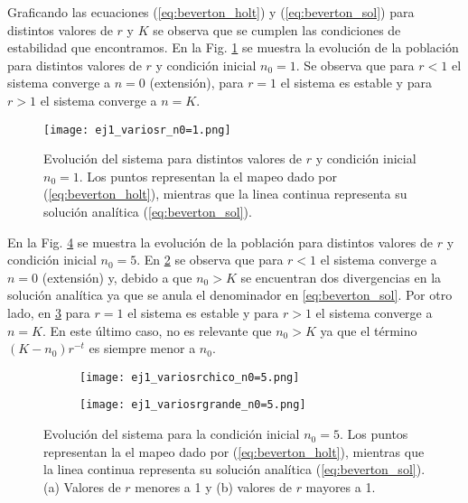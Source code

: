 \documentclass[letterpaper,12pt]{article}
\theoremstyle{plain}
\begin{document}
Graficando las ecuaciones (\ref*{eq:beverton_holt}) y (\ref*{eq:beverton_sol}) para distintos valores de $r$ y $K$ se observa que se cumplen las condiciones de estabilidad que encontramos. En la Fig. \ref*{fig:ej1_variosr_n0=1} se muestra la evolución de la población para distintos valores de $r$ y condición inicial $n_0=1$. Se observa que para $r<1$ el sistema converge a $n=0$ (extensión), para $r=1$ el sistema es estable y para $r>1$ el sistema converge a $n=K$.

\begin{figure}[h]
    \centering
    \texttt{[image: ej1\_variosr\_n0=1.png]}
    \caption{Evolución del sistema para distintos valores de $r$ y condición inicial $n_0=1$. Los puntos representan la el mapeo dado por (\ref*{eq:beverton_holt}), mientras que la linea continua representa su solución analítica (\ref*{eq:beverton_sol}).} 
    \label{fig:ej1_variosr_n0=1}
\end{figure}

En la Fig. \ref*{fig:ej1_variosn0} se muestra la evolución de la población para distintos valores de $r$ y condición inicial $n_0=5$. En \ref*{fig:ej1_variosrchico_n0=5} se observa que para $r<1$ el sistema converge a $n=0$ (extensión) y, debido a que $n_0>K$ se encuentran dos divergencias en la solución analítica ya que se anula el denominador en \ref*{eq:beverton_sol}. Por otro lado, en \ref*{fig:ej1_variosrgrande_n0=5} para $r=1$ el sistema es estable y para $r>1$ el sistema converge a $n=K$. En este último caso, no es relevante que $n_0>K$ ya que el término $(K - n_0)r^{-t}$ es siempre menor a $n_0$.

\begin{figure}[h]
    \centering
    \begin{subfigure}[b]{0.49\textwidth}
        \texttt{[image: ej1\_variosrchico\_n0=5.png]}
        \caption{}
        \label{fig:ej1_variosrchico_n0=5}
    \end{subfigure}
    \hfill
    \begin{subfigure}[b]{0.49\textwidth}
        \texttt{[image: ej1\_variosrgrande\_n0=5.png]}
        \caption{}
        \label{fig:ej1_variosrgrande_n0=5}
    \end{subfigure}
    \caption{Evolución del sistema para la condición inicial $n_0=5$. Los puntos representan la el mapeo dado por (\ref*{eq:beverton_holt}), mientras que la linea continua representa su solución analítica (\ref*{eq:beverton_sol}). (a) Valores de $r$ menores a 1 y (b) valores de $r$ mayores a 1.}
    \label{fig:ej1_variosn0}
\end{figure}
\end{document}
